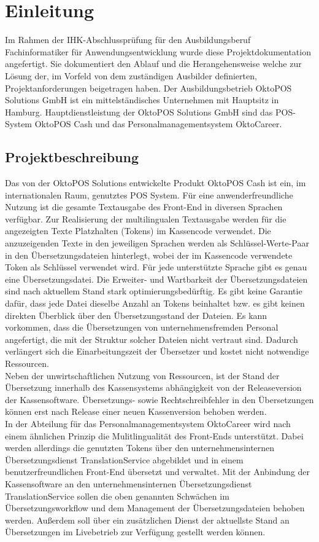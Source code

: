 \documentclass[10pt, oneside, ngerman]{article}
\begin{document}
  \section{Einleitung}
    Im Rahmen der IHK-Abschlussprüfung für den Ausbildungsberuf Fachinformatiker für Anwendungsentwicklung
    wurde diese Projektdokumentation angefertigt. Sie dokumentiert den Ablauf und die Herangehensweise 
    welche zur Lösung der, im Vorfeld von dem zuständigen Ausbilder definierten, Projektanforderungen beigetragen haben. 
    Der Ausbildungsbetrieb OktoPOS Solutions GmbH ist ein mittelständisches Unternehmen mit Hauptsitz in Hamburg. Hauptdienstleistung der
    OktoPOS Solutions GmbH sind das POS-System OktoPOS Cash und das Personalmanagementsystem OktoCareer.
  \subsection{Projektbeschreibung}\label{sec:projectdesc}
    Das von der OktoPOS Solutions entwickelte Produkt OktoPOS Cash ist ein, im internationalen Raum, genutztes POS System. 
    Für eine anwenderfreundliche Nutzung ist die gesamte Textausgabe des Front-End in diversen Sprachen verfügbar. 
    Zur Realisierung der multilingualen Textausgabe werden für die angezeigten Texte Platzhalten (Tokens) im Kassencode verwendet. 
    Die anzuzeigenden Texte in den jeweiligen Sprachen werden als Schlüssel-Werte-Paar in den Übersetzungsdateien hinterlegt, 
    wobei der im Kassencode verwendete Token als Schlüssel verwendet wird. 
    Für jede unterstützte Sprache gibt es genau eine Übersetzungsdatei.
    Die Erweiter- und Wartbarkeit der Übersetzungsdateien sind nach aktuellem Stand stark optimierungsbedürftig. 
    Es gibt keine Garantie dafür, dass jede Datei dieselbe Anzahl an Tokens beinhaltet bzw. es gibt keinen direkten Überblick 
    über den Übersetzungsstand der Dateien. 
    Es kann vorkommen, dass die Übersetzungen von unternehmensfremden Personal angefertigt, 
    die mit der Struktur solcher Dateien nicht vertraut sind. Dadurch verlängert sich die Einarbeitungszeit der Übersetzer und kostet 
    nicht notwendige Ressourcen.\\ %
    Neben der unwirtschaftlichen Nutzung von Ressourcen, ist der Stand der Übersetzung innerhalb des Kassensystems abhängigkeit von der Releaseversion der Kassensoftware. 
    Übersetzungs- sowie Rechtschreibfehler in den Übersetzungen können erst nach Release einer neuen Kassenversion behoben werden.\\
    In der Abteilung für das Personalmanagementsystem OktoCareer wird nach einem ähnlichen Prinzip die Mulitlingualität des Front-Ends unterstützt. Dabei 
    werden allerdings die genutzten Tokens über den unternehmensinternen Übersetzungsdienst TranslationService abgebildet und in einem benutzerfreundlichen Front-End übersetzt und verwaltet.
    Mit der Anbindung der Kassensoftware an den unternehmensinternen Übersetzungsdienst TranslationService sollen die oben genannten Schwächen im Übersetzungsworkflow 
    und dem Management der Übersetzungsdateien behoben werden. 
    Außerdem soll über ein zusätzlichen Dienst der aktuellste Stand an Übersetzungen im Livebetrieb zur Verfügung gestellt werden können.
\end{document}
